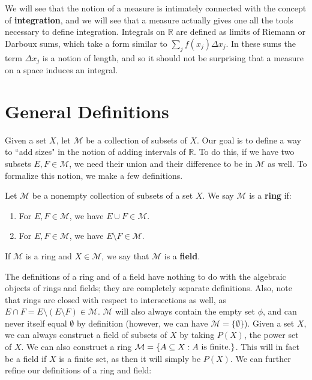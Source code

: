 We will see that the notion of a measure is intimately connected with the concept of \textbf{integration}, and we will see that a 
measure actually gives one all the tools necessary to define integration. Integrals on $\mathbb R$ are defined as limits of Riemann or 
Darboux sums, which take a form similar to $\sum_j f(x_j)\Delta x_j$. In these sums the term $\Delta x_j$ is a notion of length, and so 
it should not be surprising that a measure on a space induces an integral.

\newpage
\section{General Definitions}

	Given a set $X$, let $\mathcal M$ be a collection of subsets of $X$. Our goal is to define a way to ``add sizes" in the 
	notion of adding intervals of $\mathbb R$. To do this, if we have two subsets $E, F\in\mathcal M$, we need their union and 
	their difference to be in $\mathcal M$ as well. To formalize this notion, we make a few definitions.
	
	\begin{definition}
		Let $\mathcal M$ be a nonempty collection of subsets of a set $X$. We say $\mathcal M$ is a \textbf{ring} if:
		\begin{enumerate}
			\item For $E, F\in\mathcal M$, we have $E\cup F\in\mathcal M$.
			\item For $E, F\in\mathcal M$, we have $E\setminus F\in\mathcal M$.
		\end{enumerate}
		If $\mathcal M$ is a ring and $X\in\mathcal M$, we say that $\mathcal M$ is a \textbf{field}.
	\end{definition}
	
	The definitions of a ring and of a field have nothing to do with the algebraic objects of rings and fields; they are completely 
	separate definitions. Also, note that rings are closed with respect to intersections as well, as $E\cap F = E\setminus(E
	\setminus F)\in\mathcal M$. $\mathcal M$ will also always contain the empty set $\phi$, and can never itself equal 
	$\emptyset$ by definition (however, we can have $\mathcal M = \{\emptyset\}$). Given a set $X$, we can always 
	construct a field of subsets of $X$ by taking $P(X)$, the power set of $X$. We can also construct a ring $\mathcal M = 
	\{A\subseteq X : A \textnormal{ is finite.}\}$. This will in fact be a field if $X$ is a finite set, as then it will simply be $P(X)$. 
	We can further refine our definitions of a ring and field:
	
